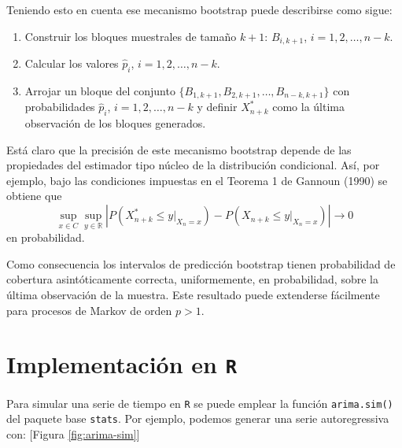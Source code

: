 \documentclass[]{book}
\theoremstyle{definition}
\theoremstyle{definition}
\theoremstyle{definition}
\theoremstyle{remark}
\begin{document}
Teniendo esto en cuenta ese mecanismo bootstrap puede describirse como
sigue:

\begin{enumerate}
\def\labelenumi{\arabic{enumi}.}
\item
  Construir los bloques muestrales de tamaño \(k+1\): \(B_{i,k+1}\),
  \(i=1,2,\ldots ,n-k\).
\item
  Calcular los valores \(\widehat{p}_i\), \(i=1,2,\ldots ,n-k\).
\item
  Arrojar un bloque del conjunto
  \(\{B_{1,k+1},B_{2,k+1},\ldots ,B_{n-k,k+1}\}\) con probabilidades
  \(\widehat{p}_i\), \(i=1,2,\ldots ,n-k\) y definir \(X_{n+k}^{\ast}\)
  como la última observación de los bloques generados.
\end{enumerate}

Está claro que la precisión de este mecanismo bootstrap depende de las
propiedades del estimador tipo núcleo de la distribución condicional.
Así, por ejemplo, bajo las condiciones impuestas en el Teorema 1 de
Gannoun (1990) se obtiene que
\[\sup_{x\in C}\sup_{y\in \mathbb{R}}\left\vert P\left( X_{n+k}^{\ast}\leq
y|_{X_n=x} \right) -P\left( X_{n+k}\leq y|_{X_n=x} \right) \right\vert
\rightarrow 0\] en probabilidad.

Como consecuencia los intervalos de predicción bootstrap tienen
probabilidad de cobertura asintóticamente correcta, uniformemente, en
probabilidad, sobre la última observación de la muestra. Este resultado
puede extenderse fácilmente para procesos de Markov de orden \(p>1\).

\section{\texorpdfstring{Implementación en
\texttt{R}}{Implementación en R}}\label{implementacion-en-r}

Para simular una serie de tiempo en \texttt{R} se puede emplear la
función \texttt{arima.sim()} del paquete base \texttt{stats}. Por
ejemplo, podemos generar una serie autoregressiva con: {[}Figura
\ref{fig:arima-sim}{]}
\end{document}
